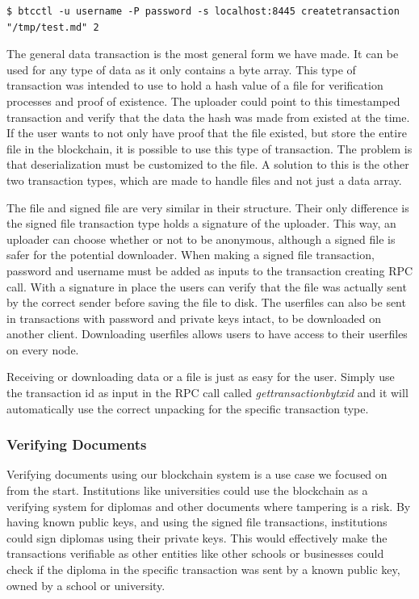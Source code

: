 \documentclass[12pt]{article}
\begin{document}
\begin{lstlisting}[float=h!,caption={Transaction creation command example},label=lst:btcctl]
$ btcctl -u username -P password -s localhost:8445 createtransaction "/tmp/test.md" 2
\end{lstlisting}

The general data transaction is the most general form we have made. It can be used for any type of data as it only contains a byte array. This type of transaction was intended to use to hold a hash value of a file for verification processes and proof of existence. The uploader could point to this timestamped transaction and verify that the data the hash was made from existed at the time. If the user wants to not only have proof that the file existed, but store the entire file in the blockchain, it is possible to use this type of transaction. The problem is that deserialization must be customized to the file. A solution to this is the other two transaction types, which are made to handle files and not just a data array. 

The file and signed file are very similar in their structure. Their only difference is the signed file transaction type holds a signature of the uploader. This way, an uploader can choose whether or not to be anonymous, although a signed file is safer for the potential downloader. When making a signed file transaction, password and username must be added as inputs to the transaction creating RPC call. With a signature in place the users can verify that the file was actually sent by the correct sender before saving the file to disk. The userfiles can also be sent in transactions with password and private keys intact, to be downloaded on another client. Downloading userfiles allows users to have access to their userfiles on every node.

Receiving or downloading data or a file is just as easy for the user. Simply use the transaction id as input in the RPC call called \textit{gettransactionbytxid} and it will automatically use the correct unpacking for the specific transaction type. 

\subsubsection{Verifying Documents}
Verifying documents using our blockchain system is a use case we focused on from the start. Institutions like universities could use the blockchain as a verifying system for diplomas and other documents where tampering is a risk. By having known public keys, and using the signed file transactions, institutions could sign diplomas using their private keys. This would effectively make the transactions verifiable as other entities like other schools or businesses could check if the diploma in the specific transaction was sent by a known public key, owned by a school or university. 
\end{document}
